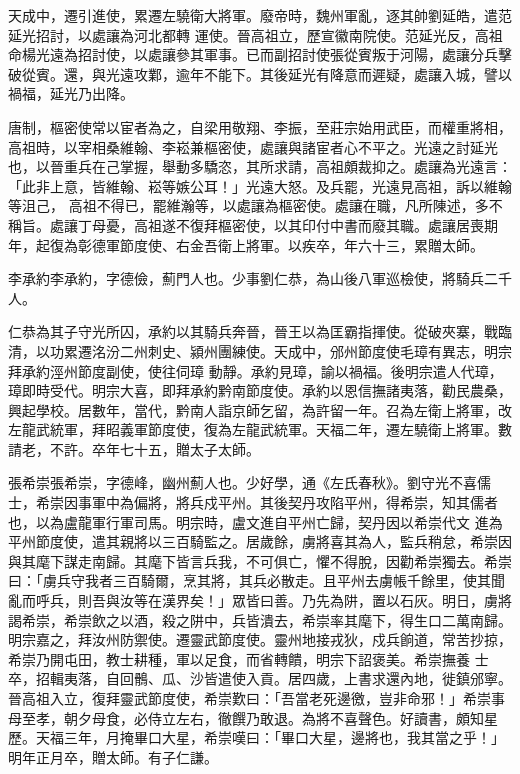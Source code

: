 \begin{pinyinscope}
 天成中，遷引進使，累遷左驍衛大將軍。廢帝時，魏州軍亂，逐其帥劉延皓，遣范延光招討，以處讓為河北都轉
 運使。晉高祖立，歷宣徽南院使。范延光反，高祖命楊光遠為招討使，以處讓參其軍事。已而副招討使張從賓叛于河陽，處讓分兵擊破從賓。還，與光遠攻鄴，逾年不能下。其後延光有降意而遲疑，處讓入城，譬以禍福，延光乃出降。



 唐制，樞密使常以宦者為之，自梁用敬翔、李振，至莊宗始用武臣，而權重將相，高祖時，以宰相桑維翰、李崧兼樞密使，處讓與諸宦者心不平之。光遠之討延光也，以晉重兵在己掌握，舉動多驕恣，其所求請，高祖頗裁抑之。處讓為光遠言：「此非上意，皆維翰、崧等嫉公耳！」光遠大怒。及兵罷，光遠見高祖，訴以維翰等沮己，
 高祖不得已，罷維瀚等，以處讓為樞密使。處讓在職，凡所陳述，多不稱旨。處讓丁母憂，高祖遂不復拜樞密使，以其印付中書而廢其職。處讓居喪期年，起復為彰德軍節度使、右金吾衛上將軍。以疾卒，年六十三，累贈太師。



 李承約李承約，字德儉，薊門人也。少事劉仁恭，為山後八軍巡檢使，將騎兵二千人。



 仁恭為其子守光所囚，承約以其騎兵奔晉，晉王以為匡霸指揮使。從破夾寨，戰臨清，以功累遷洺汾二州刺史、潁州團練使。天成中，邠州節度使毛璋有異志，明宗拜承約涇州節度副使，使往伺璋
 動靜。承約見璋，諭以禍福。後明宗遣人代璋，璋即時受代。明宗大喜，即拜承約黔南節度使。承約以恩信撫諸夷落，勸民農桑，興起學校。居數年，當代，黔南人詣京師乞留，為許留一年。召為左衛上將軍，改左龍武統軍，拜昭義軍節度使，復為左龍武統軍。天福二年，遷左驍衛上將軍。數請老，不許。卒年七十五，贈太子太師。



 張希崇張希崇，字德峰，幽州薊人也。少好學，通《左氏春秋》。劉守光不喜儒士，希崇因事軍中為偏將，將兵戍平州。其後契丹攻陷平州，得希崇，知其儒者也，以為盧龍軍行軍司馬。明宗時，盧文進自平州亡歸，契丹因以希崇代文
 進為平州節度使，遣其親將以三百騎監之。居歲餘，虜將喜其為人，監兵稍怠，希崇因與其麾下謀走南歸。其麾下皆言兵我，不可俱亡，懼不得脫，因勸希崇獨去。希崇曰：「虜兵守我者三百騎爾，烹其將，其兵必散走。且平州去虜帳千餘里，使其聞亂而呼兵，則吾與汝等在漢界矣！」眾皆曰善。乃先為阱，置以石灰。明日，虜將謁希崇，希崇飲之以酒，殺之阱中，兵皆潰去，希崇率其麾下，得生口二萬南歸。明宗嘉之，拜汝州防禦使。遷靈武節度使。靈州地接戎狄，戍兵餉道，常苦抄掠，希崇乃開屯田，教士耕種，軍以足食，而省轉饋，明宗下詔褒美。希崇撫養
 士卒，招輯夷落，自回鶻、瓜、沙皆遣使入貢。居四歲，上書求還內地，徙鎮邠寧。晉高祖入立，復拜靈武節度使，希崇歎曰：「吾當老死邊徼，豈非命邪！」希崇事母至孝，朝夕母食，必侍立左右，徹饌乃敢退。為將不喜聲色。好讀書，頗知星歷。天福三年，月掩畢口大星，希崇嘆曰：「畢口大星，邊將也，我其當之乎！」明年正月卒，贈太師。有子仁謙。




\end{pinyinscope}
